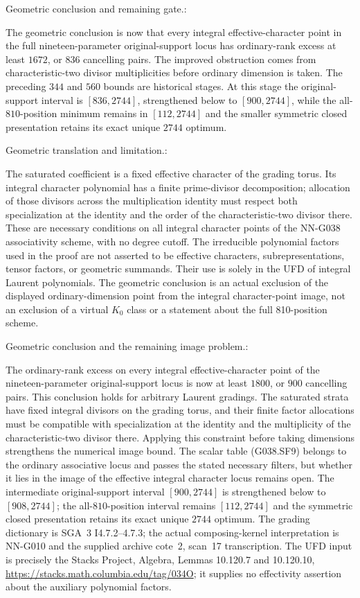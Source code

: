 \begin{geometricstatement}[NN-G038]
Geometric conclusion and remaining gate.:

The geometric conclusion is now that every integral
effective-character point in the full nineteen-parameter
original-support locus has ordinary-rank excess at least
$1672$, or $836$ cancelling pairs. The improved obstruction
comes from characteristic-two divisor multiplicities before
ordinary dimension is taken. The preceding $344$ and $560$
bounds are historical stages. At this stage the original-support interval is $[836,2744]$,
strengthened below to $[900,2744]$, while the all-$810$-position
minimum remains in $[112,2744]$ and the smaller symmetric
closed presentation retains its exact unique $2744$ optimum.


Geometric translation and limitation.:

The saturated coefficient is a fixed effective character of the
grading torus.  Its integral character polynomial has a finite
prime-divisor decomposition; allocation of those divisors across
the multiplication identity must respect both specialization at
the identity and the order of the characteristic-two divisor there.
These are necessary conditions on all integral character points
of the NN-G038 associativity scheme, with no degree cutoff.
The irreducible polynomial factors used in the proof are not
asserted to be effective characters, subrepresentations, tensor
factors, or geometric summands.  Their use is solely in the UFD
of integral Laurent polynomials.  The geometric conclusion is an
actual exclusion of the displayed ordinary-dimension point from
the integral character-point image, not an exclusion of a virtual
$K_0$ class or a statement about the full 810-position scheme.


Geometric conclusion and the remaining image problem.:

The ordinary-rank excess on every integral effective-character point
of the nineteen-parameter original-support locus is now at least
$1800$, or $900$ cancelling pairs.  This conclusion holds for arbitrary
Laurent gradings.  The saturated strata have fixed integral divisors
on the grading torus, and their finite factor allocations must be
compatible with specialization at the identity and the multiplicity
of the characteristic-two divisor there.  Applying this constraint
before taking dimensions strengthens the numerical image bound.
The scalar table (G038.SF9) belongs to the ordinary associative locus
and passes the stated necessary filters, but whether it lies in the
image of the effective integral character locus remains open.
The intermediate original-support interval $[900,2744]$ is
strengthened below to $[908,2744]$;
the all-$810$-position interval remains $[112,2744]$ and the symmetric
closed presentation retains its exact unique $2744$ optimum.
The grading dictionary is SGA~3 I4.7.2--4.7.3; the actual
composing-kernel interpretation is NN-G010 and the supplied archive
cote~2, scan~17 transcription.  The UFD input is precisely the Stacks
Project, Algebra, Lemmas 10.120.7 and 10.120.10,
\url{https://stacks.math.columbia.edu/tag/034O}; it supplies no
effectivity assertion about the auxiliary polynomial factors.



\end{geometricstatement}
